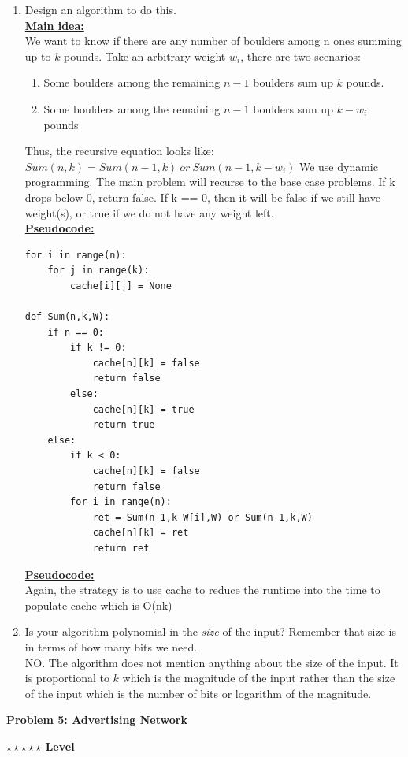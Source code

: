\documentclass{article}\usepackage[utf8]{inputenc}\usepackage[margin=0.4cm,top=0.4cm,bottom=0.4cm]{geometry}
\begin{document}
\begin{enumerate}
\item Design an algorithm to do this.
\BeginSolution %
\\
\underline{\textbf{Main idea:}}\\
We want to know if there are any number of boulders among n ones summing up to $k$ pounds. Take an arbitrary weight $w_i$, there are two scenarios:
%
\begin{enumerate}[1.]
	\item Some boulders among the remaining $n-1$ boulders sum up $k$ pounds.
	\item Some boulders among the remaining $n-1$ boulders sum up $k - w_i$ pounds
\end{enumerate}
%
Thus, the recursive equation looks like:\\
	$Sum(n,k) = Sum(n-1,k)\ or\ Sum(n-1,k-w_i)$
We use dynamic programming. The main problem will recurse to the base case problems. If k drops below 0, return false. If k == 0, then it will be false if we still have weight(s), or true if we do not have any weight left.\\
\underline{\textbf{Pseudocode:}}\\
%
\begin{lstlisting}
for i in range(n):
	for j in range(k):
		cache[i][j] = None

def Sum(n,k,W):
	if n == 0:
		if k != 0:
			cache[n][k] = false
			return false
		else:
			cache[n][k] = true
			return true
	else:
		if k < 0:
			cache[n][k] = false
			return false
		for i in range(n):
			ret = Sum(n-1,k-W[i],W) or Sum(n-1,k,W)
			cache[n][k] = ret
			return ret
\end{lstlisting}
%
\underline{\textbf{Pseudocode:}}\\
Again, the strategy is to use cache to reduce the runtime into the time to populate cache which is O(nk)
\EndSolution

\item Is your algorithm polynomial in the {\it size} of the input? Remember that size is in terms of how many bits we need.
\BeginSolution %
\\
NO. The algorithm does not mention anything about the size of the input. It is proportional to $k$ which is the magnitude of the input rather than the size of the input which is the number of bits or logarithm of the magnitude.
\EndSolution
\end{enumerate}
\clearpage

\vspace{-2mm}\noindent\begin{mybox}{\begin{center}\textbf{\color{black}Problem 5: Advertising Network}\end{center}}\end{mybox}\vspace{-2mm}
\begin{myboxot}\noindent\textbf{$\star\star\star\star\star$ Level}\end{myboxot} 
\end{document}
